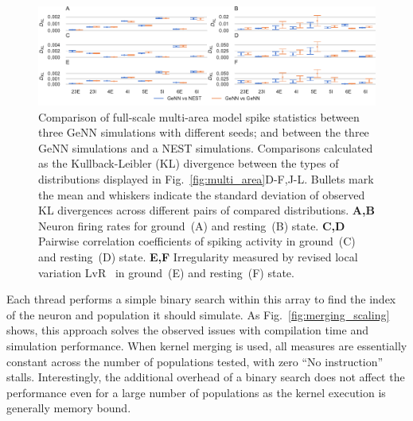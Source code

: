 \documentclass[9pt,a4paper]{amsart}
\newenvironment{fullwidth}{%
  \begin{adjustwidth}{-0.85in}{-0.85in}
}{\end{adjustwidth}}
\begin{document}
%
\begin{figure}
    \begin{fullwidth}
        \centering
        \includegraphics{figures/microcircuit_accuracy_kl}
        \captionsetup{width=6.69in}
        \caption{Comparison of full-scale multi-area model spike statistics between three GeNN simulations with different seeds; and between the three GeNN simulations and a NEST simulations. Comparisons calculated as the Kullback-Leibler (KL) divergence between the types of distributions displayed in Fig.~\ref{fig:multi_area}D-F,J-L. Bullets mark the mean and whiskers indicate the standard deviation of observed KL divergences across different pairs of compared distributions.
        \textbf{A,B} Neuron firing rates for ground~(A) and resting~(B) state.
        \textbf{C,D} Pairwise correlation coefficients of spiking activity in ground~(C) and resting~(D) state.
        \textbf{E,F} Irregularity measured by revised local variation LvR~\citep{Shinomoto2009} in ground~(E) and resting~(F) state.}
        \label{fig:microcircuit_accuracy_kl}
    \end{fullwidth}
\end{figure}
%
Each thread performs a simple binary search within this array to find the index of the neuron and population it should simulate.
As Fig.~\ref{fig:merging_scaling} shows, this approach solves the observed issues with compilation time and simulation performance. When kernel merging is used, all measures are essentially constant across the number of populations tested, with zero ``No instruction'' stalls. Interestingly, the additional overhead of a binary search does not affect the performance even for a large number of populations as the kernel execution is generally memory bound.
\end{document}
